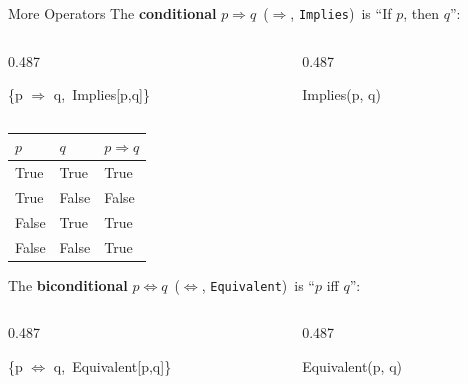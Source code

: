 \documentclass[aspectratio=169]{beamer}
\newcommand{\wcode}[1]{\texttt{\textcolor{wfg}{#1}}}
\newcommand{\dualcols}[2]{%
  \begin{columns}[T,onlytextwidth]
    \begin{column}{0.487\textwidth}
      \begin{tcolorbox}[wfstyle]#1\end{tcolorbox}
    \end{column}
    \begin{column}{0.487\textwidth}
      \begin{tcolorbox}[spstyle]#2\end{tcolorbox}
    \end{column}
  \end{columns}
}
\begin{document}
\begin{frame}[t]{More Operators}
  The \textbf{conditional} $p \Rightarrow q$
  \,($\Rightarrow$, \wcode{Implies})\,
  is ``If $p$, then $q$'':
  \vspace{2pt}
  \dualcols{%
    \{p $\Rightarrow$ q,\ Implies[p,q]\}
  }{%
    Implies(p, q)
  }

  \begin{center}
    \renewcommand{\arraystretch}{1.2}
    \begin{tabular}{|>{\centering}p{1.5cm}|>{\centering}p{1.5cm}|>{\centering\arraybackslash}p{2cm}|}
      \hline $p$ & $q$ & $p \Rightarrow q$\\\hline
      \rowcolor{rowred}  True  & True  & True\\
      \rowcolor{rowblue} True  & False & False\\
      \rowcolor{rowred}  False & True  & True\\
      \rowcolor{rowred}  False & False & True\\\hline
    \end{tabular}
  \end{center}
  \vspace{2pt}

  The \textbf{biconditional} $p \Leftrightarrow q$
  \,($\Leftrightarrow$, \wcode{Equivalent})\,
  is ``$p$ iff $q$'':
  \vspace{2pt}
  \dualcols{%
    \{p $\Leftrightarrow$ q,\ Equivalent[p,q]\}
  }{%
    Equivalent(p, q)
  }
\end{frame}
\end{document}
